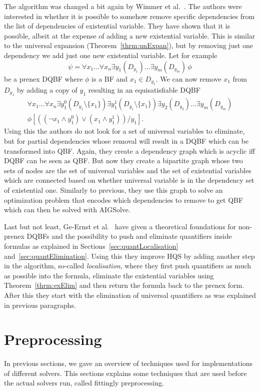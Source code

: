 \documentclass[
  digital, %
  color,
  twoside, %
  table,   %
  nolof,     %
  nolot,     %
]{fithesis3}
\theoremstyle{definition}
\theoremstyle{remark}
\newcommand{\itholds}{\,}
\begin{document}
The algorithm was changed a bit again by Wimmer et al.~\cite{HQSdependencyElimination}. The authors were interested in whether it is possible to somehow remove specific dependencies from the list of dependencies of existential variable. They have shown that it is possible, albeit at the expense of adding a new existential variable. This is similar to the universal expansion (Theorem~\ref{thrm:unExpan}), but by removing just one dependency we add just one new existential variable. Let for example
\[\psi = \forall x_1 \dots \forall x_n \exists y_1(D_{y_1}) \dots \exists y_m(D_{y_m}) \itholds \phi\]
be a prenex DQBF where $\phi$ is a BF and $x_1 \in D_{y_1}$. We can now remove $x_1$ from $D_{y_1}$ by adding a copy of $y_1$ resulting in an equisatisfiable DQBF
\begin{multline*}
\forall x_1 \dots \forall x_n \exists y_1^0(D_{y_1} \setminus \{x_1\}) \exists y_1^1(D_{y_1} \setminus \{x_1\}) \exists y_2(D_{y_2})\dots \exists y_m(D_{y_m}) \\
\phi\left[((\neg x_1 \land y_1^0) \lor (x_1 \land y_1^1))/y_1\right].
\end{multline*}
Using this the authors do not look for a set of universal variables to eliminate, but for partial dependencies whose removal will result in a DQBF which can be transformed into QBF. Again, they create a dependency graph which is acyclic iff DQBF can be seen as QBF. But now they create a bipartite graph whose two sets of nodes are the set of universal variables and the set of existential variables which are connected based on whether universal variable is in the dependency set of existential one. Similarly to previous, they use this graph to solve an optimization problem that encodes which dependencies to remove to get QBF which can then be solved with AIGSolve.

Last but not least, Ge-Ernst et al.~\cite{HQSquantifierLocalisation} have given a theoretical foundations for non-prenex DQBFs and the possibility to push and eliminate quantifiers inside formulas as explained in Sections~\ref{sec:quantLocalisation} and~\ref{sec:quantElimination}. Using this they improve HQS by adding another step in the algorithm, so-called \emph{localisation}, where they first push quantifiers as much as possible into the formula, eliminate the existential variables using Theorem~\ref{thrm:exElim} and then return the formula back to the prenex form. After this they start with the elimination of universal quantifiers as was explained in previous paragraphs.

\section{Preprocessing}
\label{sec:preprocessing}
In previous sections, we gave an overview of techniques used for implementations of different solvers. This sections explains some techniques that are used before the actual solvers run, called fittingly preprocessing.
\end{document}
